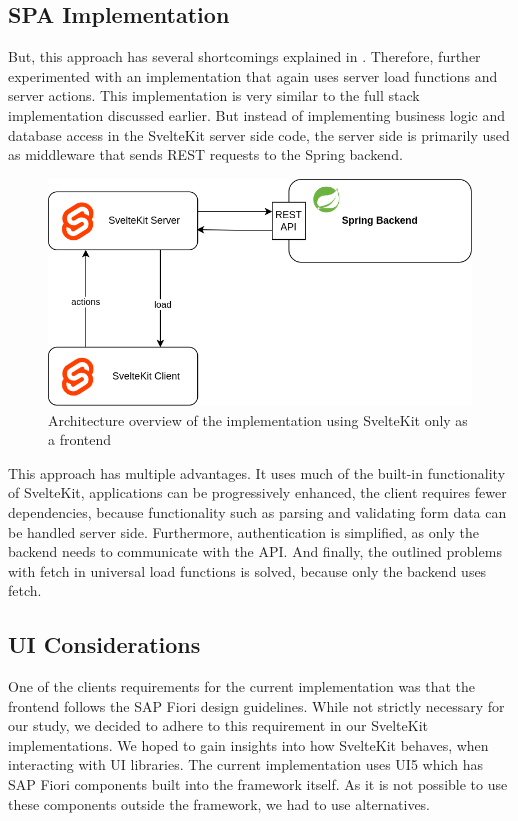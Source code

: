 \subsection{SPA Implementation}
\label{sec:implementation-redirect}
But, this approach has several shortcomings explained in . Therefore, further experimented with an implementation that again uses server load functions and server actions. This implementation is very similar to the full stack implementation discussed earlier. But instead of implementing business logic and database access in the SvelteKit server side code, the server side is primarily used as middleware that sends REST requests to the Spring backend.

\begin{figure}[ht]
    \centering
    \includegraphics[width=.6\linewidth]{assets/fe-only-all-server}
    \caption{Architecture overview of the implementation using SvelteKit only as a frontend}
    \label{fig:dswfd-architecture-fe-through-server}
\end{figure}

This approach has multiple advantages. It uses much of the built-in functionality of SvelteKit, applications can be progressively enhanced, the client requires fewer dependencies, because functionality such as parsing and validating form data can be handled server side. Furthermore, authentication is simplified, as only the backend needs to communicate with the API. And finally, the outlined problems with fetch in universal load functions is solved, because only the backend uses fetch.


\subsection{UI Considerations}
\label{sec:implementation-ui}
One of the clients requirements for the current implementation was that the frontend follows the SAP Fiori design guidelines. While not strictly necessary for our study, we decided to adhere to this requirement in our SvelteKit implementations. We hoped to gain insights into how SvelteKit behaves, when interacting with UI libraries. The current implementation uses UI5 which has SAP Fiori components built into the framework itself. As it is not possible to use these components outside the framework, we had to use alternatives.   

